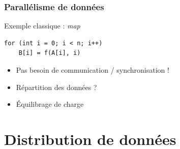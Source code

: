 \documentclass[xcolor={x11names,svgnames}]{beamer}
\begin{document}

\begin{frame}[fragile]
\frametitle{Parallélisme de données}


\begin{block}{Exemple classique : \emph{map}}
\begin{verbatim}
for (int i = 0; i < n; i++)
    B[i] = f(A[i], i)
\end{verbatim}
\end{block}

\bigskip

\begin{itemize}
\item Pas besoin de communication / synchronisation !
\item Répartition des données ?
\item Équilibrage de charge
\end{itemize}
\end{frame}


\section{Distribution de données}
\end{document}
